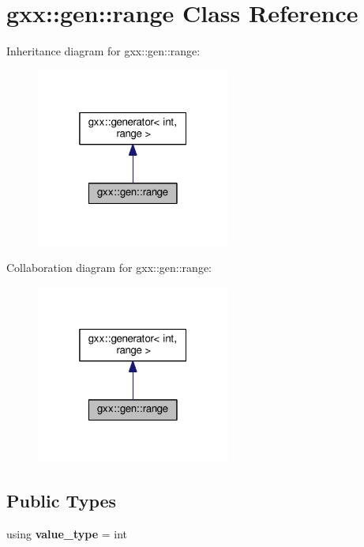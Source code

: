 \hypertarget{classgxx_1_1gen_1_1range}{}\section{gxx\+:\+:gen\+:\+:range Class Reference}
\label{classgxx_1_1gen_1_1range}


Inheritance diagram for gxx\+:\+:gen\+:\+:range\+:\nopagebreak
\begin{figure}[H]
\begin{center}
\leavevmode
\includegraphics[width=181pt]{classgxx_1_1gen_1_1range__inherit__graph}
\end{center}
\end{figure}


Collaboration diagram for gxx\+:\+:gen\+:\+:range\+:\nopagebreak
\begin{figure}[H]
\begin{center}
\leavevmode
\includegraphics[width=181pt]{classgxx_1_1gen_1_1range__coll__graph}
\end{center}
\end{figure}
\subsection*{Public Types}
\begin{DoxyCompactItemize}
\item 
using {\bfseries value\+\_\+type} = int\hypertarget{classgxx_1_1gen_1_1range_a221e6ed27ea08bc4cd90741838dbfad0}{}\label{classgxx_1_1gen_1_1range_a221e6ed27ea08bc4cd90741838dbfad0}

\end{DoxyCompactItemize}
